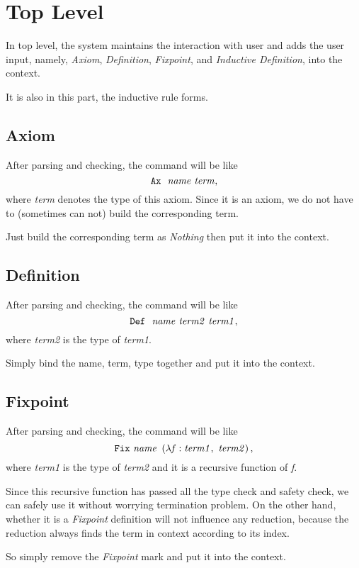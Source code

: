 \section{Top Level}

In top level, the system maintains the interaction with user and
adds the user input, namely, \textit{Axiom}, \textit{Definition}, \textit{Fixpoint}, and \textit{Inductive Definition}, 
into the context.\par
It is also in this part, the inductive rule forms.

\subsection{Axiom}
After parsing and checking, the command will be like
$$
\tt Ax\ \ {\it name\ term},
$$ 
where {\it term} denotes the type of this axiom.
Since it is an axiom, we do not have to (sometimes can not) build the corresponding term.\par
Just build the corresponding term as {\it Nothing} then put it into the context.

\subsection{Definition}
After parsing and checking, the command will be like
$$
\tt Def\ \ {\it name\ term2\ term1},
$$
where {\it term2} is the type of {\it term1}.\par
Simply bind the name, term, type together and put it into the context.

\subsection{Fixpoint}
After parsing and checking, the command will be like
$$
\tt Fix\ {\it name }\ \left(\lambda {\it f}:{ \it term1},\ {\it term2}\right),
$$
where {\it term1} is the type of {\it term2} and it is a recursive function of {\it f}.\par 
Since this recursive function has passed all the type check and safety check, we can safely use it without worrying termination
problem.
On the other hand, whether it is a {\it Fixpoint} definition will not influence any reduction, because the reduction
always finds the term in context according to its index.\par
So simply remove the {\it Fixpoint} mark and put it into the context.

